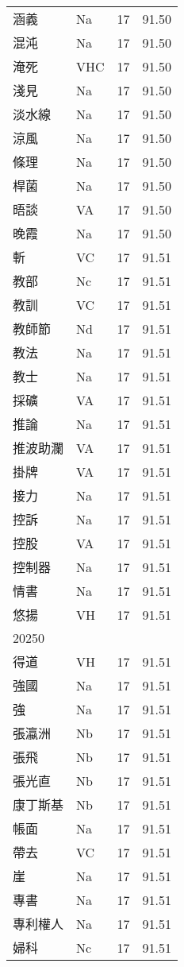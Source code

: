 \documentclass[twocolumn]{book}
\begin{document}
\begin{supertabular}{llrr}
涵義 & Na & 17 &  91.50\\
混沌 & Na & 17 &  91.50\\
淹死 & VHC & 17 &  91.50\\
淺見 & Na & 17 &  91.50\\
淡水線 & Na & 17 &  91.50\\
涼風 & Na & 17 &  91.50\\
條理 & Na & 17 &  91.50\\
桿菌 & Na & 17 &  91.50\\
晤談 & VA & 17 &  91.50\\
晚霞 & Na & 17 &  91.50\\
斬 & VC & 17 &  91.51\\
教部 & Nc & 17 &  91.51\\
教訓 & VC & 17 &  91.51\\
教師節 & Nd & 17 &  91.51\\
教法 & Na & 17 &  91.51\\
教士 & Na & 17 &  91.51\\
採礦 & VA & 17 &  91.51\\
推論 & Na & 17 &  91.51\\
推波助瀾 & VA & 17 &  91.51\\
掛牌 & VA & 17 &  91.51\\
接力 & Na & 17 &  91.51\\
控訴 & Na & 17 &  91.51\\
控股 & VA & 17 &  91.51\\
控制器 & Na & 17 &  91.51\\
情書 & Na & 17 &  91.51\\
悠揚 & VH & 17 &  91.51\\
20250\\
得道 & VH & 17 &  91.51\\
強國 & Na & 17 &  91.51\\
強 & Na & 17 &  91.51\\
張瀛洲 & Nb & 17 &  91.51\\
張飛 & Nb & 17 &  91.51\\
張光直 & Nb & 17 &  91.51\\
康丁斯基 & Nb & 17 &  91.51\\
帳面 & Na & 17 &  91.51\\
帶去 & VC & 17 &  91.51\\
崖 & Na & 17 &  91.51\\
專書 & Na & 17 &  91.51\\
專利權人 & Na & 17 &  91.51\\
婦科 & Nc & 17 &  91.51\\

\end{supertabular}
\end{document}
